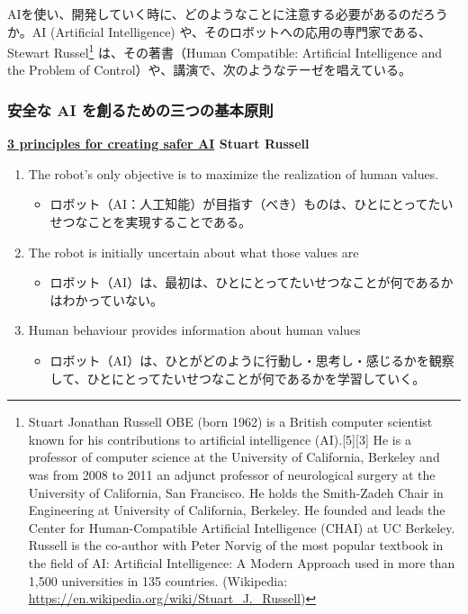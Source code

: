 \documentclass[
]{bxjsbook}
\providecommand{\tightlist}{%
  \setlength{\itemsep}{0pt}\setlength{\parskip}{0pt}}
\theoremstyle{definition}
\theoremstyle{definition}
\theoremstyle{definition}
\theoremstyle{definition}
\theoremstyle{remark}
\begin{document}
AIを使い、開発していく時に、どのようなことに注意する必要があるのだろうか。AI (Artificial Intelligence) や、そのロボットへの応用の専門家である、Stewart Russel\footnote{Stuart Jonathan Russell OBE (born 1962) is a British computer scientist known for his contributions to artificial intelligence (AI).{[}5{]}{[}3{]} He is a professor of computer science at the University of California, Berkeley and was from 2008 to 2011 an adjunct professor of neurological surgery at the University of California, San Francisco. He holds the Smith-Zadeh Chair in Engineering at University of California, Berkeley. He founded and leads the Center for Human-Compatible Artificial Intelligence (CHAI) at UC Berkeley. Russell is the co-author with Peter Norvig of the most popular textbook in the field of AI: Artificial Intelligence: A Modern Approach used in more than 1,500 universities in 135 countries. (Wikipedia: \url{https://en.wikipedia.org/wiki/Stuart_J._Russell})} は、その著書（Human Compatible: Artificial Intelligence and the Problem of Control）や、講演で、次のようなテーゼを唱えている。

\hypertarget{ux5b89ux5168ux306a-ai-ux3092ux5275ux308bux305fux3081ux306eux4e09ux3064ux306eux57faux672cux539fux5247}{%
\subsubsection{安全な AI を創るための三つの基本原則}\label{ux5b89ux5168ux306a-ai-ux3092ux5275ux308bux305fux3081ux306eux4e09ux3064ux306eux57faux672cux539fux5247}}

\textbf{\href{https://www.newworldai.com/three-principles-for-creating-safer-artificial-intelligence-stuart-russell/}{3 principles for creating safer AI} \textbar{} Stuart Russell}

\begin{enumerate}
\def\labelenumi{\arabic{enumi}.}
\tightlist
\item
  The robot's only objective is to maximize the realization of human values.

  \begin{itemize}
  \tightlist
  \item
    ロボット（AI：人工知能）が目指す（べき）ものは、ひとにとってたいせつなことを実現することである。
  \end{itemize}
\item
  The robot is initially uncertain about what those values are

  \begin{itemize}
  \tightlist
  \item
    ロボット（AI）は、最初は、ひとにとってたいせつなことが何であるかはわかっていない。
  \end{itemize}
\item
  Human behaviour provides information about human values

  \begin{itemize}
  \tightlist
  \item
    ロボット（AI）は、ひとがどのように行動し・思考し・感じるかを観察して、ひとにとってたいせつなことが何であるかを学習していく。
  \end{itemize}
\end{enumerate}
\end{document}
